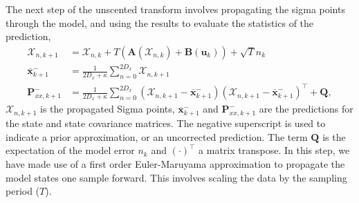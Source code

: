 \documentclass[10pt]{article}%
\begin{document}
The next step of the unscented transform involves propagating the sigma points through the model, and using the results to evaluate the statistics of the prediction,
\begin{align}\label{eqn: SigmaProp}%
\mathbf{\mathcal{X}}_{n,k+1} &= \mathbf{\mathcal{X}}_{n,k}+ T(\mathbf{A}(\mathbf{\mathcal{X}}_{n,k}) +\mathbf{B}(\mathbf{u}_{k})) +\sqrt{T}{n}_{k}\\
\label{eqn: PriorSMean}
\overline{\mathbf{x}}_{k+1}^{-} &= \frac{1}{2D_{x}+\kappa}\sum_{n=0}^{2D_{x}} \mathbf{\mathcal{X}}_{n,k+1}\\
\label{eqn: PriorSCov}
\mathbf{P}_{xx,k+1}^{-} &= \frac{1}{2D_{x}+\kappa}\sum_{n=0}^{2D_{x}} (\mathbf{\mathcal{X}}_{n,k+1} -\mathbf{\overline{x}}_{k+1}^{-})(\mathbf{\mathcal{X}}_{n,k+1}-\mathbf{\overline{x}}_{k+1}^{-})^{\top} + \mathbf{Q},%
\end{align} $\mathbf{\mathcal{X}}_{n,k+1}$ is the propagated Sigma points, $\overline{\mathbf{x}}_{k+1}^{-}$ and $\mathbf{P}_{xx,k+1}^{-}$ are the predictions for the state and state covariance matrices. The negative superscript is used to indicate a prior approximation, or an uncorrected prediction. The term $\mathbf{Q}$ is the expectation of the model error $n_{k}$ and $(\cdot)^{\top}$ a matrix transpose. In this step, we have made use of a first order Euler-Maruyama approximation to propagate the model states one sample forward. This involves scaling the data by the sampling period ($T$).
\end{document}
